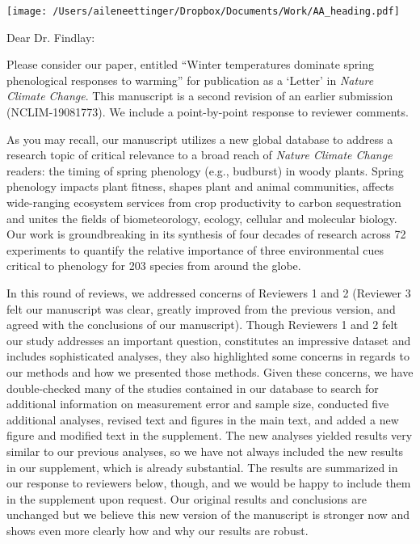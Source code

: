 \documentclass[11.5pt,a4paper]{letter}
\begin{document}
\begin{letter}{}
\texttt{[image: /Users/aileneettinger/Dropbox/Documents/Work/AA\_heading.pdf]}

\opening{Dear Dr. Findlay:}
Please consider our paper, entitled ``Winter temperatures dominate spring phenological responses to warming'' for publication as a `Letter' in \emph{Nature Climate Change}. This manuscript is a second revision of an earlier submission (NCLIM-19081773). We include a point-by-point response to reviewer comments. 

\par As you may recall, our manuscript utilizes a new global database to address a research topic of critical relevance to a broad reach of \emph{Nature Climate Change} readers:  the timing of spring phenology (e.g., budburst) in woody plants. Spring phenology impacts plant fitness, shapes plant and animal communities, affects wide-ranging ecosystem services from crop productivity to carbon sequestration and unites the fields of biometeorology, ecology, cellular and molecular biology. Our work is groundbreaking in its synthesis of four decades of research across 72 experiments to quantify the relative importance of three environmental cues critical to phenology for 203 species from around the globe. 

\par In this round of reviews, we addressed concerns of Reviewers 1 and 2 (Reviewer 3 felt our manuscript was clear, greatly improved from the previous version, and agreed with the conclusions of our manuscript). Though Reviewers 1 and 2  felt our study addresses an important question, constitutes an impressive dataset and includes sophisticated analyses, they also highlighted some concerns in regards to our methods and how we presented those methods. Given these concerns, we have double-checked many of the studies contained in our database to search for additional information on measurement error and sample size, conducted five additional analyses, revised text and figures in the main text, and added a new figure and modified text in the supplement. The new analyses yielded results very similar to our previous analyses, so we have not always included the new results in our supplement, which is already substantial. The results are summarized in our response to reviewers below, though, and we would be happy to include them in the supplement upon request. Our original results and conclusions are unchanged but we believe this new version of the manuscript is stronger now and shows even more clearly how and why our results are robust.


\end{letter}
\end{document}
